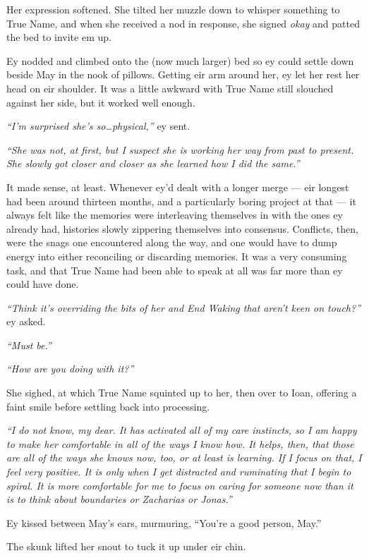 Her expression softened. She tilted her muzzle down to whisper something to True Name, and when she received a nod in response, she signed \emph{okay} and patted the bed to invite em up.

Ey nodded and climbed onto the (now much larger) bed so ey could settle down beside May in the nook of pillows. Getting eir arm around her, ey let her rest her head on eir shoulder. It was a little awkward with True Name still slouched against her side, but it worked well enough.

\emph{``I'm surprised she's so\ldots physical,''} ey sent.

\emph{``She was not, at first, but I suspect she is working her way from past to present. She slowly got closer and closer as she learned how I did the same.''}

It made sense, at least. Whenever ey'd dealt with a longer merge — eir longest had been around thirteen months, and a particularly boring project at that — it always felt like the memories were interleaving themselves in with the ones ey already had, histories slowly zippering themselves into consensus. Conflicts, then, were the snags one encountered along the way, and one would have to dump energy into either reconciling or discarding memories. It was a very consuming task, and that True Name had been able to speak at all was far more than ey could have done.

\emph{``Think it's overriding the bits of her and End Waking that aren't keen on touch?''} ey asked.

\emph{``Must be.''}

\emph{``How are you doing with it?''}

She sighed, at which True Name squinted up to her, then over to Ioan, offering a faint smile before settling back into processing.

\emph{``I do not know, my dear. It has activated all of my care instincts, so I am happy to make her comfortable in all of the ways I know how. It helps, then, that those are all of the ways she knows now, too, or at least is learning. If I focus on that, I feel very positive. It is only when I get distracted and ruminating that I begin to spiral. It is more comfortable for me to focus on caring for someone now than it is to think about boundaries or Zacharias or Jonas.''}

Ey kissed between May's ears, murmuring, ``You're a good person, May.''

The skunk lifted her snout to tuck it up under eir chin.

